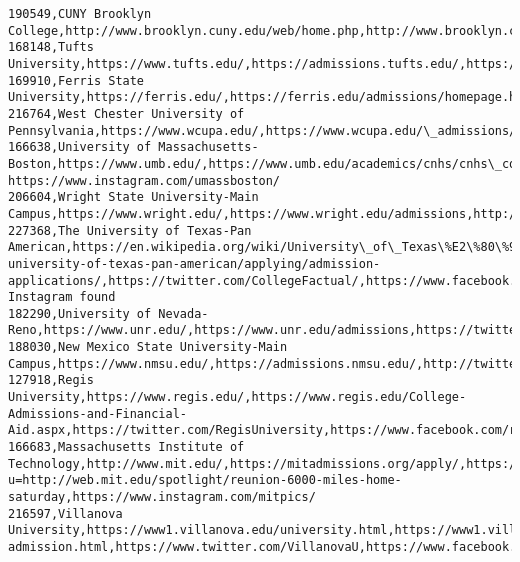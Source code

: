 \documentclass[11pt]{article}
\begin{document}
\begin{Verbatim}[commandchars=\\\{\}]
190549,CUNY Brooklyn College,http://www.brooklyn.cuny.edu/web/home.php,http://www.brooklyn.cuny.edu/web/admissions.php,http://www.brooklyn.cuny.edu/web/twitter.php,http://www.brooklyn.cuny.edu/web/facebook.php,http://www.brooklyn.cuny.edu/web/instagram.php
168148,Tufts University,https://www.tufts.edu/,https://admissions.tufts.edu/,https://twitter.com/TuftsUniversity,https://www.facebook.com/tuftsu,http://instagram.com/tuftsuniversity
169910,Ferris State University,https://ferris.edu/,https://ferris.edu/admissions/homepage.htm,https://twitter.com/FerrisState,https://www.facebook.com/5981304995,https://www.instagram.com/ferrisstateu/
216764,West Chester University of Pennsylvania,https://www.wcupa.edu/,https://www.wcupa.edu/\_admissions/sch\_adm/,https://twitter.com/wcuofpa,https://www.facebook.com/WCUPA/videos/889988421192735/,https://www.instagram.com/wcuofpa/
166638,University of Massachusetts-Boston,https://www.umb.edu/,https://www.umb.edu/academics/cnhs/cnhs\_contact,https://twitter.com/umassboston,https://www.facebook.com/umassboston, https://www.instagram.com/umassboston/
206604,Wright State University-Main Campus,https://www.wright.edu/,https://www.wright.edu/admissions,http://twitter.com/WrightState,http://www.facebook.com/WrightStateUniversity,https://www.instagram.com/wrightstateu/
227368,The University of Texas-Pan American,https://en.wikipedia.org/wiki/University\_of\_Texas\%E2\%80\%93Pan\_American,https://www.collegefactual.com/colleges/the-university-of-texas-pan-american/applying/admission-applications/,https://twitter.com/CollegeFactual/,https://www.facebook.com/CollegeFactual/,No Instagram found
182290,University of Nevada-Reno,https://www.unr.edu/,https://www.unr.edu/admissions,https://twitter.com/unevadareno,https://www.facebook.com/UniversityofNevada,http://www.instagram.com/unevadareno
188030,New Mexico State University-Main Campus,https://www.nmsu.edu/,https://admissions.nmsu.edu/,http://twitter.com/\#!/nmsu,http://www.facebook.com/newmexicostateuniversity,https://instagram.com/nmsu/
127918,Regis University,https://www.regis.edu/,https://www.regis.edu/College-Admissions-and-Financial-Aid.aspx,https://twitter.com/RegisUniversity,https://www.facebook.com/regisuniversity,http://instagram.com/regisuniversity
166683,Massachusetts Institute of Technology,http://www.mit.edu/,https://mitadmissions.org/apply/,https://twitter.com/mit,https://www.facebook.com/sharer/sharer.php?u=http://web.mit.edu/spotlight/reunion-6000-miles-home-saturday,https://www.instagram.com/mitpics/
216597,Villanova University,https://www1.villanova.edu/university.html,https://www1.villanova.edu/university/undergraduate-admission.html,https://www.twitter.com/VillanovaU,https://www.facebook.com/VillanovaU,http://www.instagram.com/villanovau

\end{Verbatim}
\end{document}
